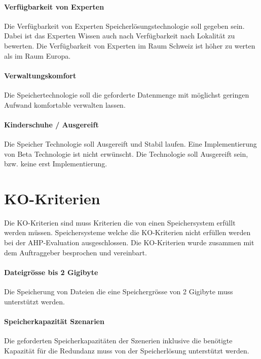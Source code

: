 \paragraph{Verfügbarkeit von Experten}\label{Soll-6-3}
Die Verfügbarkeit von Experten Speicherlösungstechnologie soll gegeben sein. Dabei ist das Experten Wissen auch nach Verfügbarkeit nach Lokalität zu bewerten. Die Verfügbarkeit von Experten im Raum Schweiz ist höher zu werten als im Raum Europa.

\paragraph{Verwaltungskomfort}\label{Soll-6-4}
Die Speichertechnologie soll die geforderte Datenmenge mit möglichst geringen Aufwand komfortable verwalten lassen.

\paragraph{Kinderschuhe / Ausgereift}\label{Soll-6-5}
Die Speicher Technologie soll Ausgereift und Stabil laufen. Eine Implementierung von Beta Technologie ist nicht erwünscht.
Die Technologie soll Ausgereift sein, bzw. keine erst Implementierung.

\section{KO-Kriterien}
Die KO-Kriterien sind muss Kriterien die von einen Speichersystem erfüllt werden müssen. Speichersysteme welche die KO-Kriterien nicht erfüllen werden bei der AHP-Evaluation ausgeschlossen. Die KO-Kriterien wurde zusammen mit dem Auftraggeber besprochen und vereinbart.

\setcounter{paragraph}{0}
\renewcommand\theparagraph{KO-\arabic{paragraph}}

\paragraph{Dateigrösse bis 2 Gigibyte}
Die Speicherung von Dateien die eine Speichergrösse von 2 Gigibyte muss unterstützt werden.

\paragraph{Speicherkapazität Szenarien}
Die geforderten Speicherkapazitäten der Szenerien inklusive die benötigte Kapazität für die Redundanz muss von der Speicherlösung unterstützt werden.

